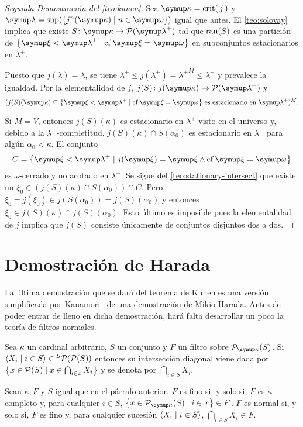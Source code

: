 \begin{proof}[Segunda Demostración del \cref{teo:kunen}]
	Sea $\kappa=\crit{j}$ y $\lambda=\sup(\set{j^n(\kappa)\mid n\in\omega})$ igual que antes.
	El \cref{teo:solovay} implica que existe $S\colon\kappa\to\pwset{\lambda^+}$ tal que
	$\operatorname{ran}(S)$ es una partición de $\set{\xi < \lambda^+\mid \cf\xi = \omega}$ en subconjuntos
	estacionarios en $\lambda^+$.

	Puesto que $j(\lambda)=\lambda$, se tiene $\lambda^+\leq j(\lambda^+) = {\lambda^+}^M\leq \lambda^+$
	y prevalece la igualdad. Por la elementalidad de $j$, $j(S)\colon j(\kappa)\to\pwset{\lambda^+}$ y
	\[
		(
		    j(S)(\kappa)\subseteq\set{\xi < \lambda^+\mid \cf\xi = \omega}
		    \,\text{es estacionario en $\lambda^+$}
		)^M.
	\]

	Si $M=V$, entonces $j(S)(\kappa)$ es estacionario en $\lambda^+$ visto en el universo y,
	debido a la $\lambda^+$-completitud, $j(S)(\kappa)\cap S(\alpha_0)$ es estacionario en $\lambda^+$
	para algún $\alpha_0<\kappa$. El conjunto
	\[
	    C = \set{\xi<\lambda^+\mid j(\xi)=\xi \land \cf\xi=\omega}
	\]
	es $\omega$-cerrado y no acotado en $\lambda^+$. Se sigue del \cref{teo:stationary-intersect} que
	existe un $\xi_0\in (j(S)(\kappa)\cap S(\alpha_0))\cap C$. Pero,
	$\xi_0 = j(\xi_0)\in j(S(\alpha_0)) = j(S)(\alpha_0)$ y entonces $\xi_0\in j(S)(\kappa)\cap j(S)(\alpha_0)$.
	Esto último es imposible pues la elementalidad de $j$ implica que $j(S)$ consiste únicamente de conjuntos
	disjuntos dos a dos.
\end{proof}

\section{Demostración de Harada}

La última demostración que se dará del teorema de Kunen es una versión simplificada
por Kanamori~\autocite{kanamori_higher_2009} de una demostración de Mikio Harada.
Antes de poder entrar de lleno en dicha demostración, hará falta desarrollar
un poco la teoría de filtros normales.

Sea $\kappa$ un cardinal arbitrario, $S$ un conjunto y $F$ un filtro sobre $\pwset[\kappa]{S}$.
Si $\seq{X_i\mid i\in S}\in {}^S\pwset{\pwset S}$ entonces su intersección diagonal viene
dada por $\set{x\in\pwset{S}\mid x\in\bigcap_{i\in x} X_i}$ y se denota por $\dint_{i\in S} X_i$.

\begin{defi}
    Sean $\kappa, F$ y $S$ igual que en el párrafo anterior.
    $F$ es fino si, y solo si, $F$ es $\kappa$-completo y, para cualquier $i\in S$,
    $\set{x\in\pwset[\kappa]{S}\mid i\in x}\in F$.
    $F$ es normal si, y solo si, $F$ es fino y, para cualquier sucesión $\langle X_i\mid i\in S \rangle$,
    $\dint_{i\in S} X_i\in F$.
\end{defi}

